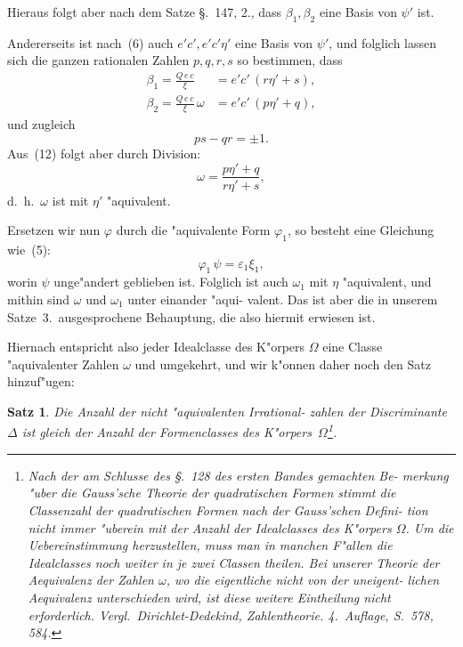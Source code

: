 \documentclass[12pt,a4paper]{article}
\theoremstyle{weber}
\newtheorem*{satz}{Satz}
\begin{document}
Hieraus folgt aber nach dem Satze \S.~147, 2., dass $\beta_1, \beta_2$
eine Basis von $\psi'$ ist.

Andererseits ist nach~(6) auch $e'c', e'c'\eta'$ eine Basis von $\psi'$,
und folglich lassen sich die ganzen rationalen Zahlen $p, q, r, s$
so bestimmen, dass
\begin{equation}\label{eq:s167-12}
\begin{aligned}
\beta_1 = \frac{Q\,e\,c}{\xi} &= e'c'\,(r\eta' + s), \\
\beta_2 = \frac{Q\,e\,c}{\xi}\,\omega &= e'c'\,(p\eta' + q),
\end{aligned}
\end{equation}
und zugleich
\begin{equation}\label{eq:s167-13}
ps - qr = \pm 1.
\end{equation}
Aus~(12) folgt aber durch Division:
\begin{equation}\label{eq:s167-14}
\omega = \frac{p\eta' + q}{r\eta' + s},
\end{equation}
d.~h.\ $\omega$ ist mit $\eta'$ "aquivalent.

Ersetzen wir nun $\varphi$ durch die "aquivalente Form $\varphi_1$, so
besteht eine Gleichung wie~(5):
\[
\varphi_1\,\psi = \varepsilon_1\xi_1,
\]
worin $\psi$ unge"andert geblieben ist. Folglich ist auch $\omega_1$ mit $\eta$
"aquivalent, und mithin sind $\omega$ und $\omega_1$ unter einander "aqui-
valent. Das ist aber die in unserem Satze~3.\ ausgesprochene
Behauptung, die also hiermit erwiesen ist.

Hiernach entspricht also jeder Idealclasse des K"orpers $\varOmega$
eine Classe "aquivalenter Zahlen $\omega$ und umgekehrt, und wir
k"onnen daher noch den Satz hinzuf"ugen:

\begin{satz}
Die Anzahl der nicht "aquivalenten Irrational-
zahlen der Discriminante $\varDelta$ ist gleich der Anzahl
der Formenclasses des K"orpers~$\varOmega$\footnote{Nach der am Schlusse des \S.~128 des ersten Bandes gemachten Be-
merkung "uber die Gauss'sche Theorie der quadratischen Formen stimmt
die Classenzahl der quadratischen Formen nach der Gauss'schen Defini-
tion nicht immer "uberein mit der Anzahl der Idealclasses des K"orpers $\varOmega$.
Um die Uebereinstimmung herzustellen, muss man in manchen F"allen die
Idealclasses noch weiter in je zwei Classen theilen. Bei unserer Theorie
der Aequivalenz der Zahlen $\omega$, wo die eigentliche nicht von der uneigent-
lichen Aequivalenz unterschieden wird, ist diese weitere Eintheilung nicht
erforderlich. Vergl.\ Dirichlet-Dedekind, Zahlentheorie. 4.~Auflage,
S.~578, 584.}.
\end{satz}
\end{document}
